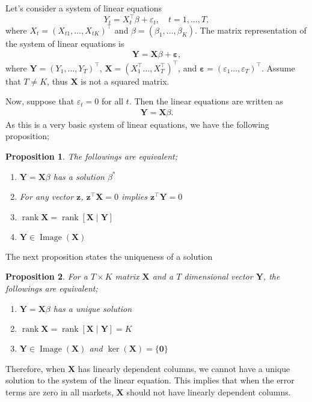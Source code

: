 \documentclass[11pt, a4paper]{article}
\newtheorem{proposition}{Proposition}
\DeclareMathOperator{\rank}{rank}
\DeclareMathOperator{\Image}{Image}
\begin{document}
Let's consider a system of linear equations
\[Y_t = X_t^\top\beta + \varepsilon_t,\quad t = 1,\ldots, T,\]
where $X_t = (X_{t1},\ldots, X_{tK})^\top$ and $\beta = (\beta_1,\ldots, \beta_K)$.
The matrix representation of the system of linear equations is 
\begin{align}\label{eq:with_error}
    \bm{Y}  = \bm{X}\beta + \bm{\varepsilon},
\end{align}
where $\bm{Y} = (Y_1, \ldots, Y_T)^\top$,  $\bm{X} = (X_1^\top\ldots, X_T^\top)^\top$, and $\bm{\varepsilon} = (\varepsilon_1\ldots, \varepsilon_T)^\top$.
Assume that $T \ne K$, thus $\bm{X}$ is not a squared matrix.

Now, suppose that $\varepsilon_t = 0$ for all $t$.
Then the linear equations are written as
\begin{align}\label{eq:without_error}
    \bm{Y} = \bm{X} \beta.
\end{align} 
As this is a very basic system of linear equations, we have the following proposition;
\begin{proposition}
The followings are equivalent;
\begin{enumerate}
    \item $\bm{Y} = \bm{X} \beta$ has a solution $\beta^*$
    \item For any vector $\bm{z}$, $\bm{z}^\top \bm{X} = 0$ implies  $\bm{z}^\top \bm{Y} = 0$ 
    \item $\rank \bm{X} = \rank [\bm{X}\mid \bm{Y}]$
    \item $\bm{Y} \in \Image(\bm{X})$
\end{enumerate}
\end{proposition}
The next proposition states the uniqueness of a solution
\begin{proposition}
    For a $T \times K$ matrix $\bm{X}$ and a $T$ dimensional vector $\bm{Y}$, the followings are equivalent;
    \begin{enumerate}
        \item $\bm{Y} = \bm{X} \beta$ has a unique solution
        \item $\rank \bm{X} = \rank [\bm{X}\mid \bm{Y}] = K$
        \item $\bm{Y} \in \Image(\bm{X})$ and $\ker(\bm{X}) = \{\bm{0}\} $
    \end{enumerate}
\end{proposition}
Therefore, when $\bm{X}$ has linearly dependent columns, we cannot have a unique solution to the system of the linear equation.
This implies that when the error terms are zero in all markets, $\bm{X}$ should not have linearly dependent columns.
\end{document}
